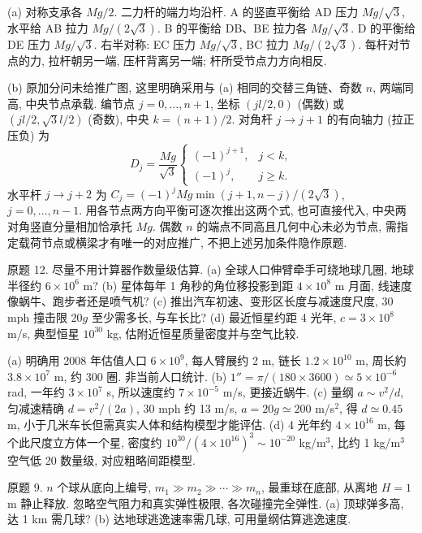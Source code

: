 \begin{solution}
(a) 对称支承各 $Mg/2$. 二力杆的端力均沿杆. A 的竖直平衡给 AD 压力 $Mg/\sqrt3$, 水平给 AB 拉力 $Mg/(2\sqrt3)$. B 的平衡给 DB、BE 拉力各 $Mg/\sqrt3$. D 的平衡给 DE 压力 $Mg/\sqrt3$. 右半对称: EC 压力 $Mg/\sqrt3$, BC 拉力 $Mg/(2\sqrt3)$. 每杆对节点的力, 拉杆朝另一端, 压杆背离另一端; 杆所受节点力方向相反.

(b) 原加分问未给推广图, 这里明确采用与 (a) 相同的交替三角链、奇数 $n$, 两端同高, 中央节点承载. 编节点 $j=0,\ldots,n+1$, 坐标 $(jl/2,0)$ (偶数) 或 $(jl/2,\sqrt3l/2)$ (奇数), 中央 $k=(n+1)/2$. 对角杆 $j\to j+1$ 的有向轴力 (拉正压负) 为
\begin{equation}
D_j=\frac{Mg}{\sqrt3}\begin{cases}(-1)^{j+1},&j<k,\\(-1)^j,&j\ge k.\end{cases}
\end{equation}
水平杆 $j\to j+2$ 为 $C_j=(-1)^jMg\min(j+1,n-j)/(2\sqrt3)$, $j=0,\ldots,n-1$. 用各节点两方向平衡可逐次推出这两个式, 也可直接代入, 中央两对角竖直分量相加恰承托 $Mg$. 偶数 $n$ 的端点不同高且几何中心未必为节点, 需指定载荷节点或横梁才有唯一的对应推广, 不把上述另加条件隐作原题.
\end{solution}
\begin{exercise}
原题 12. 尽量不用计算器作数量级估算. (a) 全球人口伸臂牵手可绕地球几圈, 地球半径约 $6\times10^6$ m? (b) 星体每年 1 角秒的角位移投影到距 $4\times10^8$ m 月面, 线速度像蜗牛、跑步者还是喷气机? (c) 推出汽车初速、变形区长度与减速度尺度, 30 mph 撞击限 20$g$ 至少需多长, 与车长比? (d) 最近恒星约距 4 光年, $c=3\times10^8$ m/s, 典型恒星 $10^{30}$ kg, 估附近恒星质量密度并与空气比较.
\end{exercise}
\begin{solution}
(a) 明确用 2008 年估值人口 $6\times10^9$, 每人臂展约 2 m, 链长 $1.2\times10^{10}$ m, 周长約 $3.8\times10^7$ m, 约 300 圈. 非当前人口统计. (b) $1''=\pi/(180\times3600)\simeq5\times10^{-6}$ rad, 一年约 $3\times10^7$ s, 所以速度约 $7\times10^{-5}$ m/s, 更接近蜗牛. (c) 量纲 $a\sim v^2/d$, 匀减速精确 $d=v^2/(2a)$, 30 mph 约 13 m/s, $a=20g\simeq200$ m/s$^2$, 得 $d\simeq0.45$ m, 小于几米车长但需真实人体和结构模型才能评估. (d) 4 光年约 $4\times10^{16}$ m, 每个此尺度立方体一个星, 密度约 $10^{30}/(4\times10^{16})^3\sim10^{-20}$ kg/m$^3$, 比约 1 kg/m$^3$ 空气低 20 数量级, 对应粗略间距模型.
\end{solution}
\begin{exercise}
原题 9. $n$ 个球从底向上编号, $m_1\gg m_2\gg\cdots\gg m_n$, 最重球在底部, 从离地 $H=1$ m 静止释放. 忽略空气阻力和真实弹性极限, 各次碰撞完全弹性. (a) 顶球弹多高, 达 1 km 需几球? (b) 达地球逃逸速率需几球, 可用量纲估算逃逸速度.
\end{exercise}
